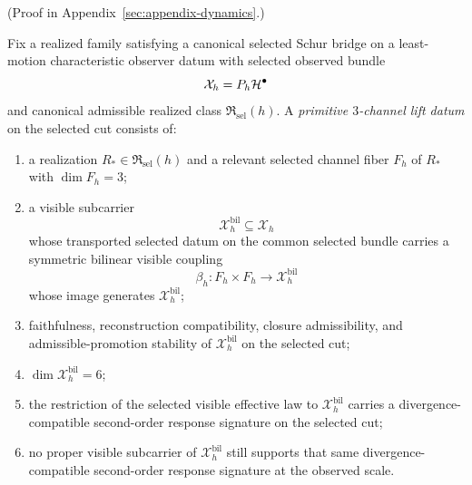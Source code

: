 (Proof in Appendix~\ref{sec:appendix-dynamics}.)

\begin{definition}
\label{def:primitive-three-symmetric-bilinear-lift-package}
Fix a realized family satisfying a canonical selected Schur bridge on a
least-motion characteristic observer datum with selected observed bundle
\[
\mathcal X_h=P_h\mathcal{H}^\bullet
\]
and canonical admissible realized class \(\mathfrak R_{\mathrm{sel}}(h)\). A
\emph{primitive \(3\)-channel lift datum} on the selected
cut consists of:
\begin{enumerate}[label=(\roman*), leftmargin=2em, itemsep=0.2em]
\item a realization \(R_\ast\in\mathfrak R_{\mathrm{sel}}(h)\) and a relevant
      selected channel fiber \(F_h\) of \(R_\ast\) with \(\dim F_h=3\);
\item a visible subcarrier
      \[
      \mathcal X_h^{\mathrm{bil}}\subseteq \mathcal X_h
      \]
      whose transported selected datum on the common selected bundle carries a
      symmetric bilinear visible coupling
      \[
      \beta_h:F_h\times F_h\to \mathcal X_h^{\mathrm{bil}}
      \]
      whose image generates \(\mathcal X_h^{\mathrm{bil}}\);
\item faithfulness, reconstruction compatibility, closure admissibility, and
      admissible-promotion stability of
      \(\mathcal X_h^{\mathrm{bil}}\) on the selected cut;
\item \(\dim \mathcal X_h^{\mathrm{bil}}=6\);
\item the restriction of the selected visible effective law to
      \(\mathcal X_h^{\mathrm{bil}}\) carries a
      divergence-compatible second-order response signature on the selected
      cut;
\item no proper visible subcarrier of \(\mathcal X_h^{\mathrm{bil}}\) still
      supports that same divergence-compatible second-order response signature
      at the observed scale.
\end{enumerate}
\end{definition}

